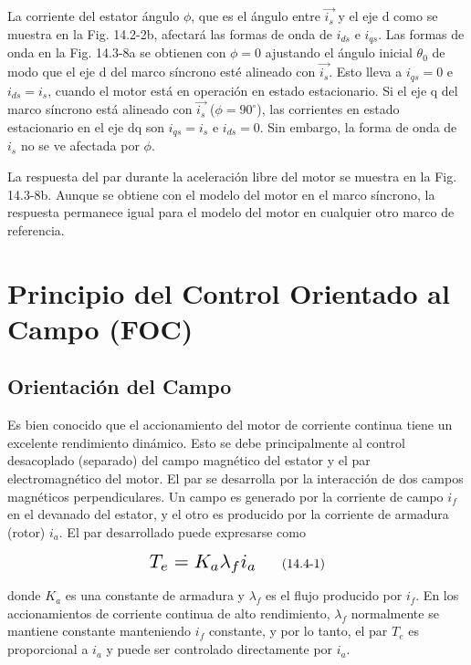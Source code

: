 \documentclass[letterpaper,12pt]{article} %
\begin{document}
La corriente del estator ángulo \( \phi \), que es el ángulo entre \( \vec{i_s} \) y el eje d como se muestra en la Fig. 14.2-2b, afectará las formas de onda de \( i_{ds} \) e \( i_{qs} \). Las formas de onda en la Fig. 14.3-8a se obtienen con \( \phi = 0 \) ajustando el ángulo inicial \(\theta_0\) de modo que el eje d del marco síncrono esté alineado con \( \vec{i_s} \). Esto lleva a \( i_{qs} = 0 \) e \( i_{ds} = i_s \), cuando el motor está en operación en estado estacionario. Si el eje q del marco síncrono está alineado con \( \vec{i_s} \) (\( \phi = 90^\circ \)), las corrientes en estado estacionario en el eje dq son \( i_{qs} = i_s \) e \( i_{ds} = 0 \). Sin embargo, la forma de onda de \( i_s \) no se ve afectada por \( \phi \).

La respuesta del par durante la aceleración libre del motor se muestra en la Fig. 14.3-8b. Aunque se obtiene con el modelo del motor en el marco síncrono, la respuesta permanece igual para el modelo del motor en cualquier otro marco de referencia.

\section{Principio del Control Orientado al Campo (FOC)}

\subsection{Orientación del Campo}

Es bien conocido que el accionamiento del motor de corriente continua tiene un excelente rendimiento dinámico. Esto se debe principalmente al control desacoplado (separado) del campo magnético del estator y el par electromagnético del motor. El par se desarrolla por la interacción de dos campos magnéticos perpendiculares. Un campo es generado por la corriente de campo \( i_f \) en el devanado del estator, y el otro es producido por la corriente de armadura (rotor) \( i_a \). El par desarrollado puede expresarse como

\[
\scalebox{1.5}{$T_e = K_a \lambda_f i_a$} \tag{14.4-1}
\]

donde \( K_a \) es una constante de armadura y \( \lambda_f \) es el flujo producido por \( i_f \). En los accionamientos de corriente continua de alto rendimiento, \( \lambda_f \) normalmente se mantiene constante manteniendo \( i_f \) constante, y por lo tanto, el par \( T_e \) es proporcional a \( i_a \) y puede ser controlado directamente por \( i_a \).
\end{document}
